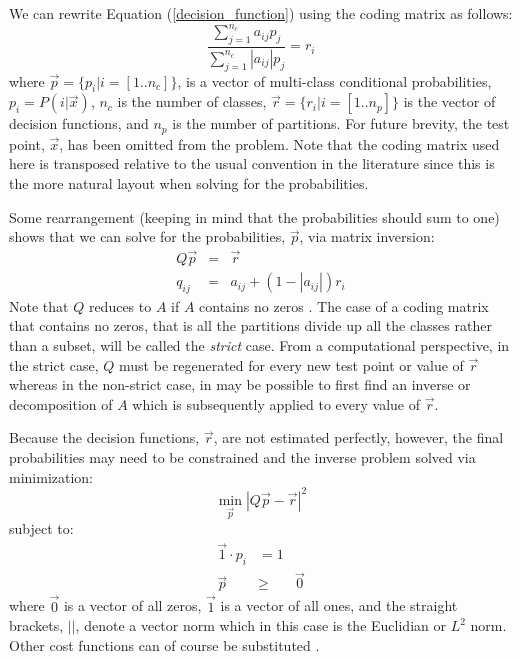 We can rewrite Equation (\ref{decision_function}) using the coding 
matrix as follows:
\begin{equation}
	\frac{\sum_{j=1}^{n_c} a_{ij} p_j}{\sum_{j=1}^{n_c} |a_{ij}| p_j} = r_i
	\label{non_hier}
\end{equation}
where $\vec p=\lbrace p_i | i=[1..n_c]\rbrace$, 
is a vector of multi-class conditional probabilities, $p_i=P(i|\vec x)$, 
$n_c$ is the number of classes,
$\vec r=\lbrace r_i| i=[1..n_p]\rbrace$ 
is the vector of decision functions,
and
$n_p$ is the number of partitions.
For future brevity, the test point, $\vec x$, has been omitted from the problem. 
Note that the coding matrix used here is transposed relative to the usual
convention in the literature since this is the more natural layout when 
solving for the probabilities.

Some rearrangement (keeping in mind that the probabilities should sum to one)
shows that we can solve for the probabilities, $\vec p$, via matrix inversion:
\begin{eqnarray}
	Q \vec p & = & \vec r \label{basic_system}\\
	q_{ij} & = & a_{ij} + (1-|a_{ij}|) r_i 
	\label{matrix_equation2}
\end{eqnarray}
Note that $Q$ reduces to $A$ if $A$ contains no zeros \citep{Kong_Dietterich1997}.
The case of a coding matrix that contains no zeros, that is all the partitions divide up all the
classes rather than a subset, will be called the {\it strict} case.
From a computational perspective,
in the strict case,
$Q$ must be regenerated for every new test point or value of $\vec r$ 
whereas in the non-strict case, in may be possible to first find an inverse or
decomposition of $A$ which is subsequently
applied to every value of $\vec r$.

Because the decision functions, $\vec r$, are not estimated perfectly, however,
the final probabilities may need to be constrained and the inverse
problem solved via minimization:
\begin{equation}
	\min_{\vec p} | Q \vec p - \vec r |^2 \label{minimization_problem}
\end{equation}
subject to:
\begin{eqnarray}
	\vec 1 \cdot p_i & = 1 \label{normalization}\\
	\vec p & \ge & \vec 0 \label{nonnegative}
\end{eqnarray}
where 
$\vec 0$ is a vector of all zeros,
$\vec 1$ is a vector of all ones,
and the straight brackets, $||$, denote a vector norm which  
in this case is the Euclidian or $L^2$ norm.
Other cost functions can of course be substituted \citep{Zadrozny2001}.

